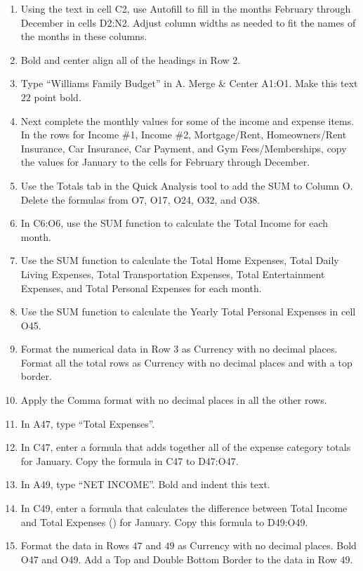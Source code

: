 \begin{enumerate}
	\item Using the text in cell \textsf{C2}, use Autofill to fill in the months February through December in cells \textsf{D2:N2}. Adjust column widths as needed to fit the names of the months in these columns.
	\item Bold and center align all of the headings in Row $ 2 $.
	\item Type ``Williams Family Budget'' in A. Merge \& Center \textsf{A1:O1}. Make this text $ 22 $ point bold.
	\item Next complete the monthly values for some of the income and expense items. In the rows for Income \#1, Income \#2, Mortgage/Rent, Homeowners/Rent Insurance, Car Insurance, Car Payment, and Gym Fees/Memberships, copy the values for January to the cells for February through December.
	\item Use the Totals tab in the Quick Analysis tool to add the SUM to Column O. Delete the formulas from \textsf{O7}, \textsf{O17}, \textsf{O24}, \textsf{O32}, and \textsf{O38}.
	\item In \textsf{C6:O6}, use the SUM function to calculate the Total Income for each month.
	\item Use the SUM function to calculate the Total Home Expenses, Total Daily Living Expenses, Total Transportation Expenses, Total Entertainment Expenses, and Total Personal Expenses for each month.
	\item Use the SUM function to calculate the Yearly Total Personal Expenses in cell \textsf{O45}.
	\item Format the numerical data in Row $ 3 $ as Currency with no decimal places. Format all the total rows as Currency with no decimal places and with a top border.
	\item Apply the Comma format with no decimal places in all the other rows.
	\item In \textsf{A47}, type ``Total Expenses''.
	\item In \textsf{C47}, enter a formula that adds together all of the expense category totals for January. Copy the formula in \textsf{C47} to \textsf{D47:O47}.
	\item In \textsf{A49}, type ``NET INCOME''. Bold and indent this text.
	\item In \textsf{C49}, enter a formula that calculates the difference between Total Income and Total Expenses () for January. Copy this formula to \textsf{D49:O49}.
	\item Format the data in Rows $ 47 $ and $ 49 $ as Currency with no decimal places. Bold \textsf{O47} and \textsf{O49}. Add a Top and Double Bottom Border to the data in Row $ 49 $.

\end{enumerate}
